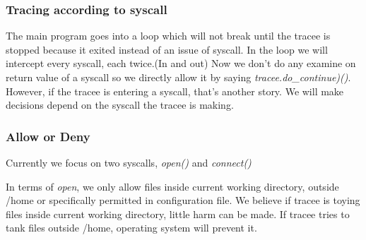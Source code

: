 \documentclass[conference,compsoc]{IEEEtran}
\begin{document}
		\subsubsection{Tracing according to syscall}
			\par
				The main program goes into a loop which will not break until the tracee is stopped because it exited instead of an issue of syscall.
				In the loop we will intercept every syscall, each twice.(In and out)
				Now we don't do any examine on return value of a syscall so we directly allow it by saying \emph{tracee.do\_continue)()}.
				However, if the tracee is entering a syscall, that's another story.
				We will make decisions depend on the syscall the tracee is making.
		\subsubsection{Allow or Deny}
			\par
				Currently we focus on two syscalls, \emph{open()} and \emph{connect()}
			\par
				In terms of \emph{open}, we only allow files inside current working directory, outside /home or specifically permitted in configuration file.
				We believe if tracee is toying files inside current working directory, little harm can be made.
				If tracee tries to tank files outside /home, operating system will prevent it.
				
\end{document}
